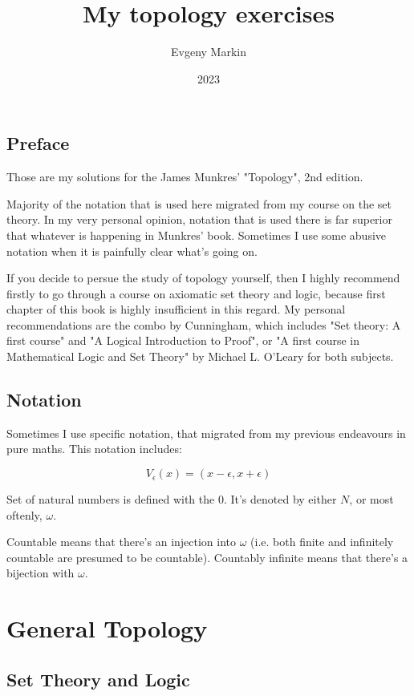 \documentclass[11pt,oneside,titlepage]{book}
\title{My topology exercises}
\author{Evgeny Markin}
\date{2023}
\begin{document}
\maketitle
\tableofcontents

\chapter*{Preface}

Those are my solutions for the James Munkres' "Topology", 2nd edition.

Majority of the notation that is used here migrated from my course on the set theory. In
my very personal opinion, notation that is used there is far superior that whatever is
happening in Munkres' book. Sometimes I use some abusive notation when it is painfully
clear what's going on.

If you decide to persue the study of topology yourself, then I highly recommend firstly
to go through a course on axiomatic set theory and logic, because first chapter of this
book is highly insufficient in this regard. My personal recommendations are the
combo by Cunningham, which includes "Set theory: A first course" and
"A Logical Introduction to Proof", or 
"A first course in Mathematical Logic and Set Theory" by Michael L. O’Leary for both subjects.

\chapter*{Notation}

Sometimes I use specific notation, that migrated from my previous endeavours in pure maths.
This notation includes:

$$V_\epsilon(x) = (x - \epsilon, x + \epsilon)$$

Set of natural numbers is defined with the 0. It's denoted by either $N$, or most oftenly,
$\omega$.

Countable means that there's an injection into $\omega$ (i.e. both finite and infinitely countable
are presumed to be countable). Countably infinite means that there's a bijection with $\omega$.

\part{General Topology}

\chapter{Set Theory and Logic}
\end{document}
